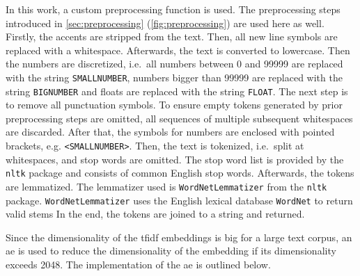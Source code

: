 In this work, a custom preprocessing function is used.
The preprocessing steps introduced in \autoref{sec:preprocessing} (\autoref{fig:preprocessing}) are used here as well.
Firstly, the accents are stripped from the text.
Then, all new line symbols are replaced with a whitespace.
Afterwards, the text is converted to lowercase.
Then the numbers are discretized, i.e.\ all numbers between 0 and 99999 are replaced with the string \texttt{SMALLNUMBER}, 
numbers bigger than 99999 are replaced with the string \texttt{BIGNUMBER} and floats are replaced with the string \texttt{FLOAT}.
The next step is to remove all punctuation symbols.
To ensure empty tokens generated by prior preprocessing steps are omitted, 
all sequences of multiple subsequent whitespaces are discarded.
After that, the symbols for numbers are enclosed with pointed brackets, e.g. \texttt{<SMALLNUMBER>}.
Then, the text is tokenized, i.e.\ split at whitespaces, and stop words are omitted.
The stop word list is provided by the \texttt{nltk} package 
and consists of common English stop words.
Afterwards, the tokens are lemmatized.
The lemmatizer used is \texttt{WordNetLemmatizer} from the \texttt{nltk} package.
\texttt{WordNetLemmatizer} uses the English lexical database \texttt{WordNet} to return valid stems \cite{nltk-lemma-wordnet}
In the end, the tokens are joined to a string and returned.

Since the dimensionality of the \ac{tfidf} embeddings is big for a large text corpus, 
an \ac{ae} is used to reduce the dimensionality of the embedding if its dimensionality exceeds 2048.
The implementation of the \ac{ae} is outlined below.